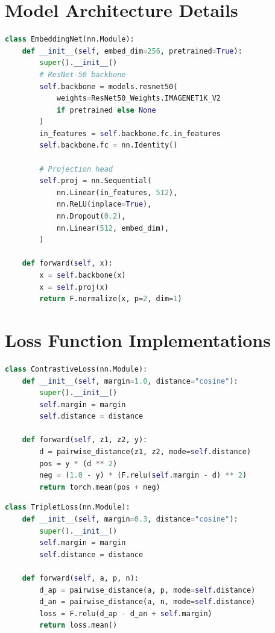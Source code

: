 \documentclass[12pt,a4paper]{article}
\begin{document}
\section{Model Architecture Details}
\label{app:architecture}

\begin{lstlisting}[language=Python, caption=EmbeddingNet Architecture]
class EmbeddingNet(nn.Module):
    def __init__(self, embed_dim=256, pretrained=True):
        super().__init__()
        # ResNet-50 backbone
        self.backbone = models.resnet50(
            weights=ResNet50_Weights.IMAGENET1K_V2 
            if pretrained else None
        )
        in_features = self.backbone.fc.in_features
        self.backbone.fc = nn.Identity()
        
        # Projection head
        self.proj = nn.Sequential(
            nn.Linear(in_features, 512),
            nn.ReLU(inplace=True),
            nn.Dropout(0.2),
            nn.Linear(512, embed_dim),
        )

    def forward(self, x):
        x = self.backbone(x)
        x = self.proj(x)
        return F.normalize(x, p=2, dim=1)
\end{lstlisting}

\section{Loss Function Implementations}
\label{app:losses}

\begin{lstlisting}[language=Python, caption=Contrastive Loss]
class ContrastiveLoss(nn.Module):
    def __init__(self, margin=1.0, distance="cosine"):
        super().__init__()
        self.margin = margin
        self.distance = distance

    def forward(self, z1, z2, y):
        d = pairwise_distance(z1, z2, mode=self.distance)
        pos = y * (d ** 2)
        neg = (1.0 - y) * (F.relu(self.margin - d) ** 2)
        return torch.mean(pos + neg)
\end{lstlisting}

\begin{lstlisting}[language=Python, caption=Triplet Loss]
class TripletLoss(nn.Module):
    def __init__(self, margin=0.3, distance="cosine"):
        super().__init__()
        self.margin = margin
        self.distance = distance

    def forward(self, a, p, n):
        d_ap = pairwise_distance(a, p, mode=self.distance)
        d_an = pairwise_distance(a, n, mode=self.distance)
        loss = F.relu(d_ap - d_an + self.margin)
        return loss.mean()
\end{lstlisting}
\end{document}
